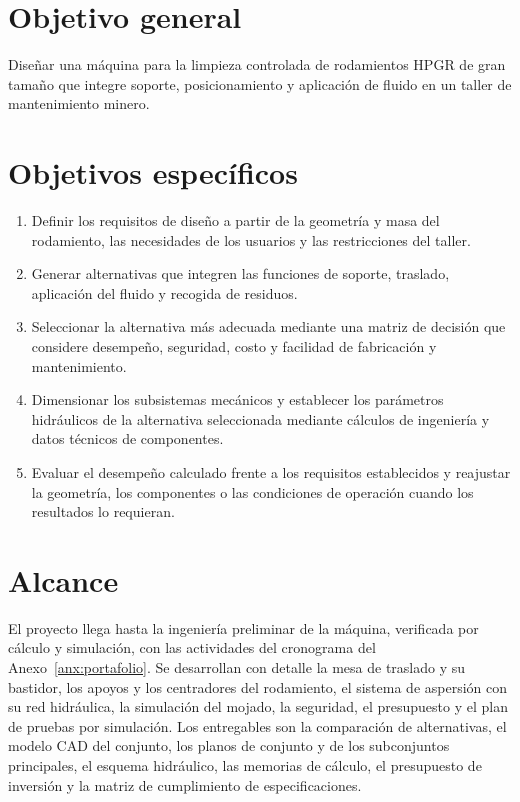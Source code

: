 \section*{Objetivo general}

Diseñar una máquina para la limpieza controlada de rodamientos HPGR de gran tamaño que integre soporte, posicionamiento y aplicación de fluido en un taller de mantenimiento minero.

\section*{Objetivos específicos}

\begin{enumerate}
\item Definir los requisitos de diseño a partir de la geometría y masa del rodamiento, las necesidades de los usuarios y las restricciones del taller.
\item Generar alternativas que integren las funciones de soporte, traslado, aplicación del fluido y recogida de residuos.
\item Seleccionar la alternativa más adecuada mediante una matriz de decisión que considere desempeño, seguridad, costo y facilidad de fabricación y mantenimiento.
\item Dimensionar los subsistemas mecánicos y establecer los parámetros hidráulicos de la alternativa seleccionada mediante cálculos de ingeniería y datos técnicos de componentes.
\item Evaluar el desempeño calculado frente a los requisitos establecidos y reajustar la geometría, los componentes o las condiciones de operación cuando los resultados lo requieran.
\end{enumerate}

\section*{Alcance}

El proyecto llega hasta la ingeniería preliminar de la máquina, verificada por cálculo y simulación, con las actividades del cronograma del Anexo~\ref{anx:portafolio}. Se desarrollan con detalle la mesa de traslado y su bastidor, los apoyos y los centradores del rodamiento, el sistema de aspersión con su red hidráulica, la simulación del mojado, la seguridad, el presupuesto y el plan de pruebas por simulación. Los entregables son la comparación de alternativas, el modelo CAD del conjunto, los planos de conjunto y de los subconjuntos principales, el esquema hidráulico, las memorias de cálculo, el presupuesto de inversión y la matriz de cumplimiento de especificaciones.

